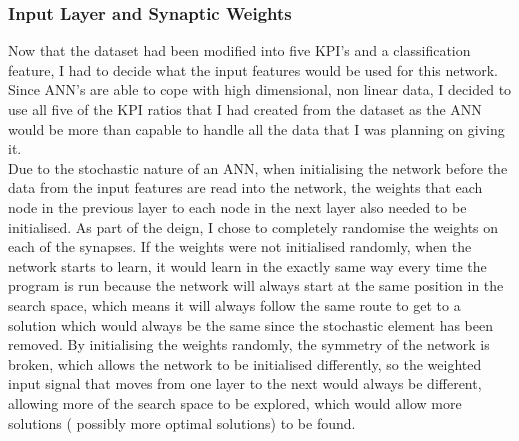 \documentclass[11pt]{article}
\begin{document}
\subsubsection{Input Layer and Synaptic Weights}
Now that the dataset had been modified into five KPI's and a classification feature, I had to decide what the input features would be used for this network. Since ANN's are able to cope with high dimensional, non linear data, I decided to use all five of the KPI ratios that I had created from the dataset as the ANN would be more than capable to handle all the data that I was planning on giving it.\\
Due to the stochastic nature of an ANN, when initialising the network before the data from the input features are read into the network, the weights that each node in the previous layer to each node in the next layer also needed to be initialised. As part of the deign, I chose to completely randomise the weights on each of the synapses. If the weights were not initialised randomly, when the network starts to learn, it would learn in the exactly same way every time the program is run because the network will always start at the same position in the search space, which means it will always follow the same route to get to a solution which would always be the same since the stochastic element has been removed.  By initialising the weights randomly, the symmetry of the network is broken, which allows the network to be initialised differently, so the weighted input signal that moves from one layer to the next would always be different, allowing more of the search space to be explored, which would allow more solutions ( possibly more optimal solutions) to be found. 
\end{document}
